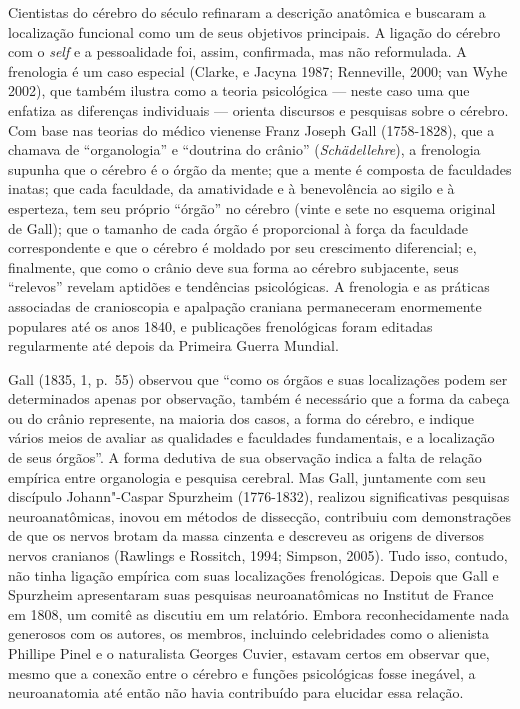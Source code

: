 Cientistas do cérebro do século  refinaram a descrição anatômica e
buscaram a localização funcional como um de seus objetivos principais. A
ligação do cérebro com o \emph{self} e a pessoalidade foi, assim, confirmada,
mas não reformulada. A frenologia é um caso especial (Clarke, e Jacyna
1987; Renneville, 2000; van Wyhe 2002), que também ilustra como a teoria
psicológica --- neste caso uma que enfatiza as diferenças individuais
--- orienta discursos e pesquisas sobre o cérebro. Com base nas teorias
do médico vienense Franz Joseph Gall (1758-1828), que a chamava de
``organologia'' e ``doutrina do crânio'' (\emph{Schädellehre}), a
frenologia supunha que o cérebro é o órgão da mente; que a mente é
composta de faculdades inatas; que cada faculdade, da amatividade e à
benevolência ao sigilo e à esperteza, tem seu próprio ``órgão'' no
cérebro (vinte e sete no esquema original de Gall); que o tamanho de
cada órgão é proporcional à força da faculdade correspondente e que o
cérebro é moldado por seu crescimento diferencial; e, finalmente, que
como o crânio deve sua forma ao cérebro subjacente, seus ``relevos''
revelam aptidões e tendências psicológicas. A frenologia e as práticas
associadas de cranioscopia e apalpação craniana permaneceram enormemente
populares até os anos 1840, e publicações frenológicas foram editadas
regularmente até depois da Primeira Guerra Mundial.

Gall (1835, 1, p.~55) observou que ``como os órgãos e suas localizações
podem ser determinados apenas por observação, também é necessário que a
forma da cabeça ou do crânio represente, na maioria dos casos, a forma
do cérebro, e indique vários meios de avaliar as qualidades e faculdades
fundamentais, e a localização de seus órgãos''. A forma dedutiva de sua
observação indica a falta de relação empírica entre organologia e
pesquisa cerebral. Mas Gall, juntamente com seu discípulo Johann"-Caspar
Spurzheim (1776-1832), realizou significativas pesquisas
neuroanatômicas, inovou em métodos de dissecção, contribuiu com
demonstrações de que os nervos brotam da massa cinzenta e descreveu as
origens de diversos nervos cranianos (Rawlings e Rossitch, 1994;
Simpson, 2005). Tudo isso, contudo, não tinha ligação empírica com suas
localizações frenológicas. Depois que Gall e Spurzheim apresentaram suas
pesquisas neuroanatômicas no Institut de France em 1808, um comitê as
discutiu em um relatório. Embora reconhecidamente nada generosos com os
autores, os membros, incluindo celebridades como o alienista Phillipe
Pinel e o naturalista Georges Cuvier, estavam certos em observar que,
mesmo que a conexão entre o cérebro e funções psicológicas fosse
inegável, a neuroanatomia até então não havia contribuído para elucidar
essa relação.

